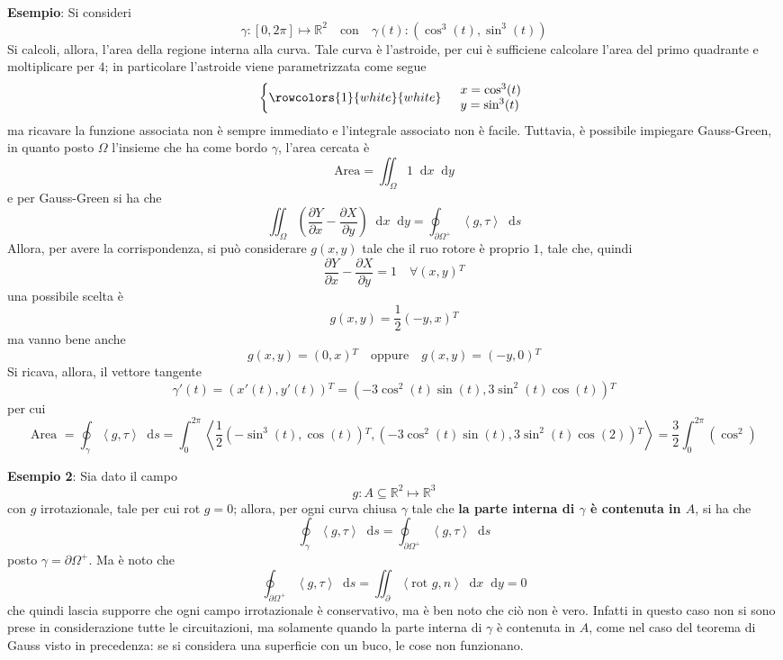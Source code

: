 \documentclass[a4paper]{extarticle}
\newcommand*\dif{\mathop{}\!\mathrm{d}}
\begin{document}
\vspace{2em}
\noindent
\textbf{Esempio}: Si consideri
\[\gamma : [0,2\pi] \longmapsto \mathbb{R}^2 \hspace{1em} \text{con} \hspace{1em} \gamma(t) : \left(\cos^3(t),\sin^3(t)\right)\]
Si calcoli, allora, l'area della regione interna alla curva. Tale curva è l'astroide, per cui è sufficiene calcolare l'area del primo quadrante e moltiplicare per $4$; in particolare l'astroide viene parametrizzata come segue
\[\left\{
    \rowcolors{1}{white}{white}
    \begin{array}{ll}
        &x=\cos^3(t)\\
        &y=\sin^3(t)
    \end{array}
\right.\]
ma ricavare la funzione associata non è sempre immediato e l'integrale associato non è facile. Tuttavia, è possibile impiegare Gauss-Green, in quanto posto $\Omega$ l'insieme che ha come bordo $\gamma$, l'area cercata è
\[\text{Area} = \iint_\Omega 1 \dif x \dif y\]
e per Gauss-Green si ha che
\[\iint_\Omega \left(\dfrac{\partial Y}{\partial x} - \dfrac{\partial X}{\partial y}\right) \dif x \dif y = \oint_{\partial \Omega^+} \left<g,\tau\right> \dif s\]
Allora, per avere la corrispondenza, si può considerare $g(x,y)$ tale che il ruo rotore è proprio $1$, tale che, quindi
\[\dfrac{\partial Y}{\partial x} - \dfrac{\partial X}{\partial y}=1 \hspace{1em} \forall (x,y){^T}\]
una possibile scelta è
\[g(x,y)=\dfrac{1}{2}\left(-y,x\right){^T}\]
ma vanno bene anche
\[g(x,y)=(0,x){^T} \hspace{1em} \text{oppure} \hspace{1em} g(x,y)=(-y,0){^T}\]
Si ricava, allora, il vettore tangente
\[\gamma'(t) = (x'(t),y'(t)){^T} = \left(-3\cos^2(t)\sin(t),3\sin^2(t)\cos(t)\right){^T}\]
per cui
\[\text{Area }=\oint_\gamma \left<g,\tau\right> \dif s = \int_0^{2\pi} \left<\dfrac{1}{2} \left(-\sin^3(t),\cos(t)\right){^T},\left(-3\cos^2(t)\sin(t),3\sin^2(t)\cos(2)\right){^T}\right> = \dfrac{3}{2} \int_0^{2\pi} \left(\cos^2\right)\]

\vspace{2em}
\noindent
\textbf{Esempio 2}: Sia dato il campo
\[g : A \subseteq \mathbb{R}^2 \longmapsto \mathbb{R}^3\]
con $g$ irrotazionale, tale per cui rot $g=0$; allora, per ogni curva chiusa $\gamma$ tale che \textbf{la parte interna di $\gamma$ è contenuta in $A$}, si ha che
\[\oint_\gamma \left<g,\tau\right> \dif s = \oint_{\partial \Omega^+} \left<g,\tau\right> \dif s\]
posto $\gamma=\partial \Omega^+$. Ma è noto che
\[\oint_{\partial \Omega^+} \left<g,\tau\right> \dif s = \iint_\partial \left<\text{rot }g,n\right> \dif x \dif y = 0\]
che quindi lascia supporre che ogni campo irrotazionale è conservativo, ma è ben noto che ciò non è vero. Infatti in questo caso non si sono prese in considerazione tutte le circuitazioni, ma solamente 
quando la parte interna di $\gamma$ è contenuta in $A$, come nel caso del teorema di Gauss visto in precedenza: se si considera una superficie con un buco, le cose non funzionano.
\end{document}
